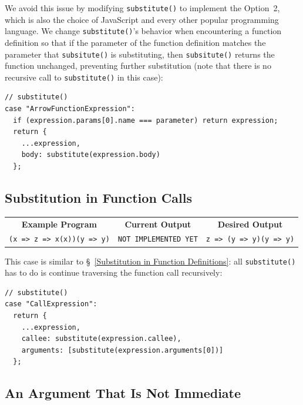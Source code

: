 \documentclass[12pt, oneside]{book}
\begin{document}
We avoid this issue by modifying \texttt{substitute()} to implement the Option~2, which is also the choice of JavaScript and every other popular programming language. We change \texttt{substitute()}’s behavior when encountering a function definition so that if the parameter of the function definition matches the parameter that \texttt{subsitute()} is substituting, then \texttt{subsitute()} returns the function unchanged, preventing further substitution (note that there is no recursive call to \texttt{substitute()} in this case):

\begin{verbatim}
// substitute()
case "ArrowFunctionExpression":
  if (expression.params[0].name === parameter) return expression;
  return {
    ...expression,
    body: substitute(expression.body)
  };
\end{verbatim}

\subsection{Substitution in Function Calls}
\label{Substitution in Function Calls}

\begin{center}
\begin{tabular}{c|c|c}
\textbf{Example Program} & \textbf{Current Output} & \textbf{Desired Output} \\
\texttt{(x => z => x(x))(y => y)} & \texttt{NOT IMPLEMENTED YET} & \texttt{z => (y => y)(y => y)} \\
\end{tabular}
\end{center}

This case is similar to §~\ref{Substitution in Function Definitions}: all \texttt{substitute()} has to do is continue traversing the function call recursively:

\begin{verbatim}
// substitute()
case "CallExpression":
  return {
    ...expression,
    callee: substitute(expression.callee),
    arguments: [substitute(expression.arguments[0])]
  };
\end{verbatim}

\subsection{An Argument That Is Not Immediate}
\label{An Argument That Is Not Immediate}
\end{document}
